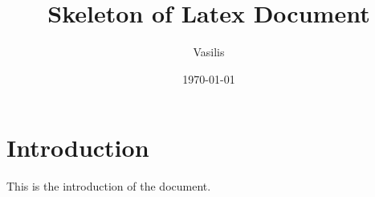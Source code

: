\documentclass{article}
\title{Skeleton of Latex Document}
\author{Vasilis}
\date{\today}
\begin{document}
	
\maketitle
	
\section{Introduction}
This is the introduction of the document.




	
\end{document}
